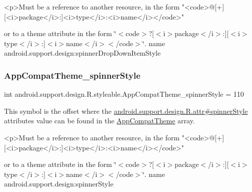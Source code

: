 \begin{DoxyVerb}      <p>Must be a reference to another resource, in the form "<code>@[+][<i>package</i>:]<i>type</i>:<i>name</i></code>"
\end{DoxyVerb}
 or to a theme attribute in the form \char`\"{}$<$code$>$?\mbox{[}$<$i$>$package$<$/i$>$\+:\mbox{]}\mbox{[}$<$i$>$type$<$/i$>$\+:\mbox{]}$<$i$>$name$<$/i$>$$<$/code$>$\char`\"{}.  name android.\+support.\+design\+:spinner\+Drop\+Down\+Item\+Style \mbox{\label{classandroid_1_1support_1_1design_1_1R_1_1styleable_a2acd7c3695b4d10f59e576bf69cfb846}} 
\subsubsection{\texorpdfstring{App\+Compat\+Theme\+\_\+spinner\+Style}{AppCompatTheme\_spinnerStyle}}
{\footnotesize\ttfamily int android.\+support.\+design.\+R.\+styleable.\+App\+Compat\+Theme\+\_\+spinner\+Style = 110\hspace{0.3cm}{\ttfamily [static]}}

This symbol is the offset where the \hyperlink{classandroid_1_1support_1_1design_1_1R_1_1attr_a822fe744c71f5d8738ea30e75cf31f90}{android.\+support.\+design.\+R.\+attr\#spinner\+Style} attribute\textquotesingle{}s value can be found in the \hyperlink{classandroid_1_1support_1_1design_1_1R_1_1styleable_afb351dc8de20cbd4c89abe360373010c}{App\+Compat\+Theme} array.

\begin{DoxyVerb}      <p>Must be a reference to another resource, in the form "<code>@[+][<i>package</i>:]<i>type</i>:<i>name</i></code>"
\end{DoxyVerb}
 or to a theme attribute in the form \char`\"{}$<$code$>$?\mbox{[}$<$i$>$package$<$/i$>$\+:\mbox{]}\mbox{[}$<$i$>$type$<$/i$>$\+:\mbox{]}$<$i$>$name$<$/i$>$$<$/code$>$\char`\"{}.  name android.\+support.\+design\+:spinner\+Style \mbox{\label{classandroid_1_1support_1_1design_1_1R_1_1styleable_a3990aa9db190f4ae9a7169c7f468bcb7}} 
